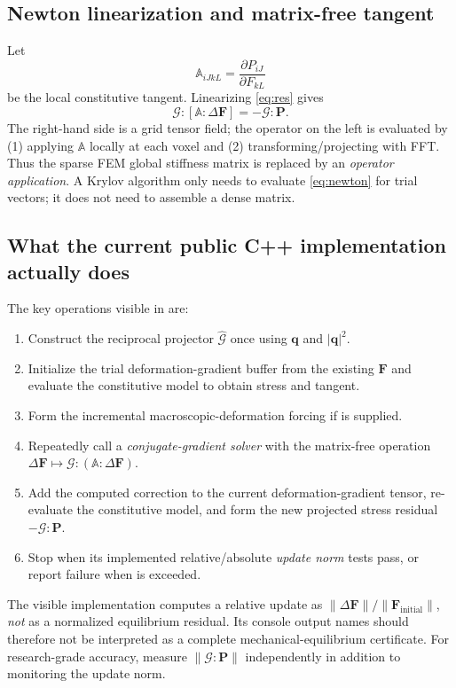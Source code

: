 \documentclass[11pt,a4paper]{article}
\newcommand{\code}[1]{\texttt{\detokenize{#1}}}
\begin{document}
\subsection{Newton linearization and matrix-free tangent}
Let
\begin{equation}
\mathbb A_{iJkL}=\frac{\partial P_{iJ}}{\partial F_{kL}}
\end{equation}
be the local constitutive tangent. Linearizing \eqref{eq:res} gives
\begin{equation}
\boxed{\quad\mathcal G:\left[\mathbb A:\Delta\mathbf F\right]
=-\mathcal G:\mathbf P.\quad}
\label{eq:newton}
\end{equation}
The right-hand side is a grid tensor field; the operator on the left is evaluated by (1) applying $\mathbb A$ locally at each voxel and (2) transforming/projecting with FFT. Thus the sparse FEM global stiffness matrix is replaced by an \emph{operator application}. A Krylov algorithm only needs to evaluate \eqref{eq:newton} for trial vectors; it does not need to assemble a dense matrix.

\subsection{What the current public C++ implementation actually does}
The key operations visible in  are:
\begin{enumerate}
\item Construct the reciprocal projector $\widehat{\mathcal G}$ once using $\mathbf q$ and $|\mathbf q|^2$.
\item Initialize the trial deformation-gradient buffer from the existing $\mathbf F$ and evaluate the constitutive model to obtain stress and tangent.
\item Form the incremental macroscopic-deformation forcing if \code{applied_macroscopic_strain} is supplied.
\item Repeatedly call a \emph{conjugate-gradient solver} with the matrix-free operation $\Delta\mathbf F\mapsto\mathcal G:(\mathbb A:\Delta\mathbf F)$.
\item Add the computed correction to the current deformation-gradient tensor, re-evaluate the constitutive model, and form the new projected stress residual $-\mathcal G:\mathbf P$.
\item Stop when its implemented relative/absolute \emph{update norm} tests pass, or report failure when \code{nl_max_its} is exceeded.
\end{enumerate}
The visible implementation computes a relative update as $\|\Delta\mathbf F\|/\|\mathbf F_{\mathrm{initial}}\|$, \emph{not} as a normalized equilibrium residual. Its console output names should therefore not be interpreted as a complete mechanical-equilibrium certificate. For research-grade accuracy, measure $\|\mathcal G:\mathbf P\|$ independently in addition to monitoring the update norm.
\end{document}
